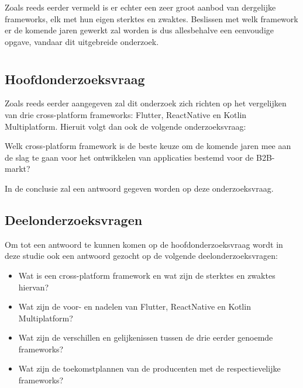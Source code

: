 Zoals reeds eerder vermeld is er echter een zeer groot aanbod van dergelijke frameworks, elk met hun eigen sterktes en zwaktes. Beslissen met welk framework er de komende jaren gewerkt zal worden is dus allesbehalve een eenvoudige opgave, vandaar dit uitgebreide onderzoek.

\section{}
\label{sec:onderzoeksvraag}


\subsection{Hoofdonderzoeksvraag}

Zoals reeds eerder aangegeven zal dit onderzoek zich richten op het vergelijken van drie cross-platform frameworks: Flutter, ReactNative en Kotlin Multiplatform. Hieruit volgt dan ook de volgende onderzoeksvraag:

Welk cross-platform framework is de beste keuze om de komende jaren mee aan de slag te gaan voor het ontwikkelen van applicaties bestemd voor de B2B-markt?

In de conclusie zal een antwoord gegeven worden op deze onderzoeksvraag.

\subsection{Deelonderzoeksvragen}

Om tot een antwoord te kunnen komen op de hoofdonderzoeksvraag wordt in deze studie ook een antwoord gezocht op de volgende deelonderzoeksvragen:

\begin{itemize}
    \item Wat is een cross-platform framework en wat zijn de sterktes en zwaktes hiervan?
    \item Wat zijn de voor- en nadelen van Flutter, ReactNative en Kotlin Multiplatform?
    \item Wat zijn de verschillen en gelijkenissen tussen de drie eerder genoemde frameworks?
    \item Wat zijn de toekomstplannen van de producenten met de respectievelijke frameworks?
\end{itemize}

